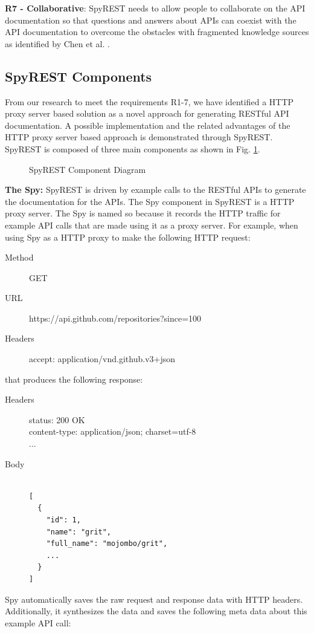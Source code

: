 \documentclass[conference]{IEEEtran}
\begin{document}
  \textbf{R7 - Collaborative}: SpyREST needs to allow people to collaborate on the API documentation so that questions and answers about APIs can coexist with the API documentation to overcome the obstacles with fragmented knowledge sources as identified by Chen et al. \cite{Chen_who_asked}.


\subsection{SpyREST Components} %
From our research to meet the requirements R1-7, we have identified a HTTP proxy server based solution as a novel approach for generating RESTful API documentation. A possible implementation and the related advantages of the HTTP proxy server based approach is demonstrated through SpyREST. SpyREST is composed of three main components as shown in Fig. \ref{fig:components}.

\begin{figure}[htb]
\centering
\def\svgwidth{\linewidth}

\caption{SpyREST Component Diagram}
\label{fig:components}
\end{figure}

\textbf{The Spy:} SpyREST is driven by example calls to the RESTful APIs to generate the documentation for the APIs. The Spy component in SpyREST is a HTTP proxy server. The Spy is named so because it records the HTTP traffic for example API calls that are made using it as a proxy server. For example, when using Spy as a HTTP proxy to make the following HTTP request:

\footnotesize
\begin{description}
  \item[Method] GET
  \item[URL] https://api.github.com/repositories?since=100
  \item[Headers] accept: application/vnd.github.v3+json
\end{description}
\normalsize
that produces the following response:
\footnotesize
\begin{description}
  \item[Headers] status: 200 OK \\
content-type: application/json; charset=utf-8 \\
...
  \item[Body]
\begin{lstlisting}

[
  {
    "id": 1,
    "name": "grit",
    "full_name": "mojombo/grit",
    ...
  }
]\end{lstlisting}
\end{description}
\normalsize
Spy automatically saves the raw request and response data with HTTP headers. Additionally, it synthesizes the data and saves the following meta data about this example API call:
\end{document}
